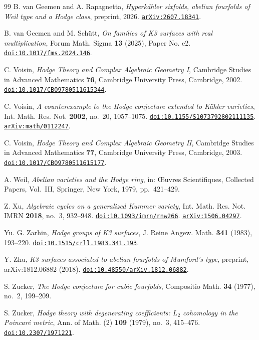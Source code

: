\begin{thebibliography}{99}
B. van Geemen and A. Rapagnetta,
\emph{Hyperk\"ahler sixfolds, abelian fourfolds of Weil type and a Hodge
class},
preprint, 2026.
\href{https://arxiv.org/abs/2607.18341}{\texttt{arXiv:2607.18341}}.

B. van Geemen and M. Sch\"utt,
\emph{On families of K3 surfaces with real multiplication},
Forum Math. Sigma \textbf{13} (2025), Paper No. e2.
\href{https://doi.org/10.1017/fms.2024.146}{\texttt{doi:10.1017/fms.2024.146}}.

C. Voisin,
\emph{Hodge Theory and Complex Algebraic Geometry I},
Cambridge Studies in Advanced Mathematics \textbf{76},
Cambridge University Press, Cambridge, 2002.
\href{https://doi.org/10.1017/CBO9780511615344}{\texttt{doi:10.1017/CBO9780511615344}}.

C. Voisin,
\emph{A counterexample to the Hodge conjecture extended to K\"ahler
varieties},
Int. Math. Res. Not. \textbf{2002}, no.~20, 1057--1075.
\href{https://doi.org/10.1155/S1073792802111135}{\texttt{doi:10.1155/S1073792802111135}}.
\href{https://arxiv.org/abs/math/0112247}{\texttt{arXiv:math/0112247}}.

C. Voisin,
\emph{Hodge Theory and Complex Algebraic Geometry II},
Cambridge Studies in Advanced Mathematics \textbf{77},
Cambridge University Press, Cambridge, 2003.
\href{https://doi.org/10.1017/CBO9780511615177}{\texttt{doi:10.1017/CBO9780511615177}}.

A. Weil,
\emph{Abelian varieties and the Hodge ring},
in: \OE uvres Scientifiques, Collected Papers, Vol.~III,
Springer, New York, 1979, pp.~421--429.

Z. Xu,
\emph{Algebraic cycles on a generalized Kummer variety},
Int. Math. Res. Not. IMRN \textbf{2018}, no.~3, 932--948.
\href{https://doi.org/10.1093/imrn/rnw266}{\texttt{doi:10.1093/imrn/rnw266}}.
\href{https://arxiv.org/abs/1506.04297}{\texttt{arXiv:1506.04297}}.

Yu. G. Zarhin,
\emph{Hodge groups of K3 surfaces},
J. Reine Angew. Math. \textbf{341} (1983), 193--220.
\href{https://doi.org/10.1515/crll.1983.341.193}{\texttt{doi:10.1515/crll.1983.341.193}}.

Y. Zhu,
\emph{K3 surfaces associated to abelian fourfolds of Mumford's type},
preprint, arXiv:1812.06882 (2018).
\href{https://doi.org/10.48550/arXiv.1812.06882}{\texttt{doi:10.48550/arXiv.1812.06882}}.

S. Zucker,
\emph{The Hodge conjecture for cubic fourfolds},
Compositio Math. \textbf{34} (1977), no.~2, 199--209.

S. Zucker,
\emph{Hodge theory with degenerating coefficients: $L_{2}$ cohomology in the
Poincar\'e metric},
Ann. of Math. (2) \textbf{109} (1979), no.~3, 415--476.
\href{https://doi.org/10.2307/1971221}{\texttt{doi:10.2307/1971221}}.

\end{thebibliography}
